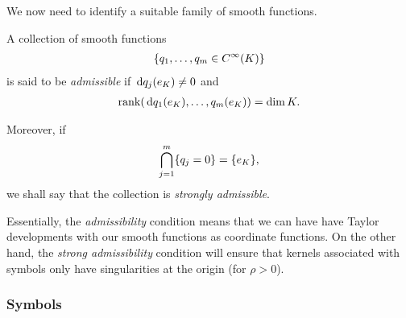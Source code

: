 We now need to identify a suitable family of smooth functions.

\begin{definition}[Admissibility]
    A collection of smooth functions
    \begin{align*}
        \{q_1, \dots, q_m \in {C^\infty(K)}\}
    \end{align*}
    is said to be \emph{admissible}
    if $\,\mathrm{d} q_j(e_K) \neq 0$ and
    \begin{align*}
        \operatorname{rank}(\,\mathrm{d} q_1(e_K), \dots, q_m(e_K))
        = \dim K.
    \end{align*}

    Moreover, if
    \begin{align*}
        \bigcap_{j = 1}^m \{q_j = 0\} = \{e_K\},
    \end{align*}
    we shall say that the collection is \emph{strongly admissible}.
\end{definition}

Essentially, the \emph{admissibility} condition means
that we can have have Taylor developments with our smooth functions as coordinate functions.
On the other hand, the \emph{strong admissibility} condition will ensure
that kernels associated with symbols only have singularities at the origin (for $\rho > 0$).

\subsubsection{Symbols}

